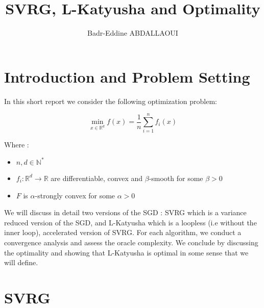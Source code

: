 \documentclass[12pt]{report}
\begin{document}
\title{SVRG, L-Katyusha and Optimality}

\author{Badr-Eddine ABDALLAOUI}

\maketitle


\newpage



\tableofcontents

\chapter{Introduction and Problem Setting}
In this short report we consider the following optimization problem:


\begin{equation} \label{pb1}
\boxed{\min_{x\in \mathbb{R}^d} f(x)=\frac{1}{n}\sum_{i=1}^nf_i(x)}
\end{equation}

Where :
\begin{itemize}
    \item $n,d \in\mathbb{N}^*$
    \item $f_i :\mathbb{R}^d\longrightarrow\mathbb{R}$ are differentiable, convex and $\beta$-smooth for some $\beta>0$
    \item $F$ is $\alpha$-strongly convex for some $\alpha>0$
\end{itemize}



We will discuss in detail two versions of the SGD : SVRG which is a variance reduced version of the SGD, and L-Katyusha which is a loopless (i.e without the inner loop), accelerated version of SVRG. For each algorithm, we conduct a convergence analysis and assess the oracle complexity. We conclude by discussing the optimality and showing that L-Katyusha is optimal in some sense that we will define. 

\chapter{SVRG}
\end{document}
